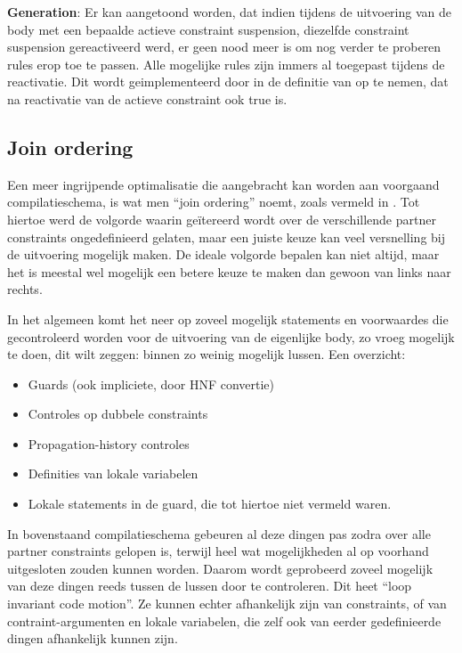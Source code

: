 {\bf Generation}: Er kan aangetoond worden, dat indien tijdens de uitvoering van de body met een bepaalde actieve constraint suspension, diezelfde constraint suspension gereactiveerd werd, er geen nood meer is om nog verder te proberen rules erop toe te passen. Alle mogelijke rules zijn immers al toegepast tijdens de reactivatie. Dit wordt geimplementeerd door in de definitie van  op te nemen, dat  na reactivatie van de actieve constraint ook true is.

\subsection{Join ordering} \label{sec:joinorder}


Een meer ingrijpende optimalisatie die aangebracht kan worden aan voorgaand compilatieschema, is wat men ``join ordering'' noemt, zoals vermeld in \cite{duck:optimizing}. Tot hiertoe werd de volgorde waarin ge\"itereerd wordt over de verschillende partner constraints ongedefinieerd gelaten, maar een juiste keuze kan veel versnelling bij de uitvoering mogelijk maken. De ideale volgorde bepalen kan niet altijd, maar het is meestal wel mogelijk een betere keuze te maken dan gewoon van links naar rechts.

In het algemeen komt het neer op zoveel mogelijk statements en voorwaardes die gecontroleerd worden voor de uitvoering van de eigenlijke body, zo vroeg mogelijk te doen, dit wilt zeggen: binnen zo weinig mogelijk lussen. Een overzicht: \begin{itemize}
  \item Guards (ook impliciete, door HNF convertie)
  \item Controles op dubbele constraints
  \item Propagation-history controles
  \item Definities van lokale variabelen
  \item Lokale statements in de guard, die tot hiertoe niet vermeld waren.
\end{itemize}
In bovenstaand compilatieschema gebeuren al deze dingen pas zodra over alle partner constraints gelopen is, terwijl heel wat mogelijkheden al op voorhand uitgesloten zouden kunnen worden. Daarom wordt geprobeerd zoveel mogelijk van deze dingen reeds tussen de lussen door te controleren. Dit heet ``loop invariant code motion''. Ze kunnen echter afhankelijk zijn van constraints, of van contraint-argumenten en lokale variabelen, die zelf ook van eerder gedefinieerde dingen afhankelijk kunnen zijn.

